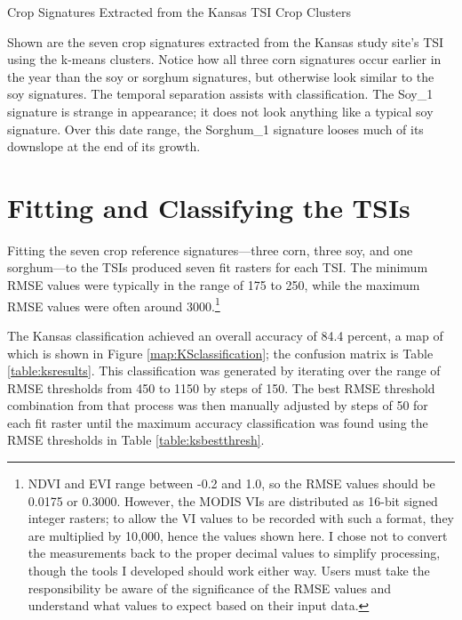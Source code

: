\begin{ssfigure}
  \centering
  
  \caption{Crop Signatures Extracted from the Kansas TSI Crop Clusters}
  \medskip
  \small
  Shown are the seven crop signatures extracted from the Kansas study site's TSI using the k-means clusters. Notice how all three corn signatures occur earlier in the year than the soy or sorghum signatures, but otherwise look similar to the soy signatures. The temporal separation assists with classification. The Soy\_1 signature is strange in appearance; it does not look anything like a typical soy signature. Over this date range, the Sorghum\_1 signature looses much of its downslope at the end of its growth.
  \label{fig:KScropsigs}
\end{ssfigure}


\section{Fitting and Classifying the TSIs}

Fitting the seven crop reference signatures---three corn, three soy, and one sorghum---to the TSIs produced seven fit rasters for each TSI. The minimum RMSE values were typically in the range of 175 to 250, while the maximum RMSE values were often around 3000.\footnote{NDVI and EVI range between -0.2 and 1.0, so the RMSE values should be 0.0175 or 0.3000. However, the MODIS VIs are distributed as 16-bit signed integer rasters; to allow the VI values to be recorded with such a format, they are multiplied by 10,000, hence the values shown here. I chose not to convert the measurements back to the proper decimal values to simplify processing, though the tools I developed should work either way.  Users must take the responsibility be aware of the significance of the RMSE values and understand what values to expect based on their input data.} 

The Kansas classification achieved an overall accuracy of 84.4 percent, a map of which is shown in Figure \ref{map:KSclassification}; the confusion matrix is Table \ref{table:ksresults}. This classification was generated by iterating over the range of RMSE thresholds from 450 to 1150 by steps of 150. The best RMSE threshold combination from that process was then manually adjusted by steps of 50 for each fit raster until the maximum accuracy classification was found using the RMSE thresholds in Table \ref{table:ksbestthresh}.

